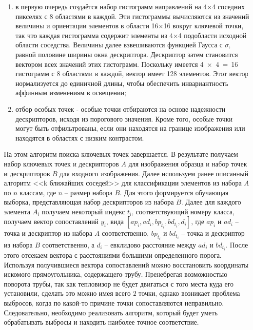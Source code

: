 \documentclass[14pt, a4paper]{extreport}
\begin{document}
\begin{enumerate}[label={\arabic*)}]
	\item в первую очередь создаётся набор гистограмм направлений на 4×4 соседних пикселях с 8 областями в каждой. Эти гистограммы вычисляются из значений величины и ориентации элементов в области 16×16 вокруг ключевой точки, так что каждая гистограмма содержит элементы из 4×4 подобласти исходной области соседства. Величины далее взвешиваются функцией Гаусса с $\sigma$, равной половине ширины окна дескриптора. Дескриптор затем становится вектором всех значений этих гистограмм. Поскольку имеется 4~×~4~=~16 гистограмм с 8 областями в каждой, вектор имеет 128 элементов. Этот вектор нормализуется до единичной длины, чтобы обеспечить инвариантность аффинным изменениям в освещении;
	
	\item отбор особых точек - особые точки отбираются на основе надежности дескрипторов, исходя из порогового значения. Кроме того, особые точки могут быть отфильтрованы, если они находятся на границе изображения или находятся в областях с низким контрастом.
	\end{enumerate}

	На этом алгоритм поиска ключевых точек завершается. 
	В результате получаем набор ключевых точек и дескрипторов $A$ для изображения образца и набор точек и дескрипторов $B$ для входного изображения. Далее используем ранее описанный алгоритм <<k ближайших соседей>> для классификации элементов из набора $A$ по $n$ классам, где $n$ -- размер набора $B$. Для этого формируется обучающая выборка, представляющая набор дескрипторов из набора $B$. Далее для каждого элемента $A_i$ получаем некоторый индекс $t_i$, соответствующий номеру класса, получаем вектор сопоставлений $y_i$, вида $[ap_i, ad_i, bp_{t_i}, bd_{t_i}, d_i]$, где $ap_i$ и $ad_i$ -- точка и дескриптор из набора $A$ соответственно, $bp_{t_i}$ и $bd_{t_i}$ -- 
	точка и дескриптор из набора $B$ соответственно, а $d_i$ -- евклидово расстояние между $ad_i$ и $bd_{t_i}$. После этого отсекаем вектора с расстояниями большими определенного порога.
	Используя получившиеся вектора сопоставлений можно восстановить координаты искомого прямоугольника, содержащего трубу. Пренебрегая возможностью поворота трубы, так как тепловизор не будет двигаться с того места куда его установили, сделать это можно имея всего 2 точки, однако возникает проблема выбросов, когда по какой-то причине точки сопоставляются неправильно. Следовательно, необходимо реализовать алгоритм, который будет уметь обрабатывать выбросы и находить наиболее точное соответствие.
	
\end{document}
